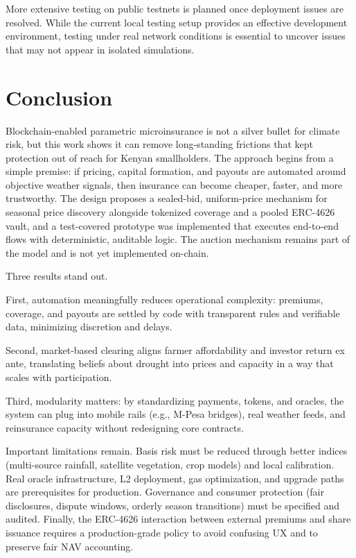 \documentclass[11pt,a4paper]{article}
\begin{document}
		More extensive testing on public testnets is planned once deployment issues are resolved. 
		While the current local testing setup provides an effective development environment, testing under real network conditions is essential to uncover issues that may not appear in isolated simulations.

		\section{Conclusion}\label{sec:conclusion}
		Blockchain-enabled parametric microinsurance is not a silver bullet for climate risk, but this work shows it can remove long-standing frictions that kept protection out of reach for Kenyan smallholders.
        The approach begins from a simple premise: if pricing, capital formation, and payouts are automated around objective weather signals, then insurance can become cheaper, faster, and more trustworthy.
        The design proposes a sealed-bid, uniform-price mechanism for seasonal price discovery alongside tokenized coverage and a pooled ERC-4626 vault, and a test-covered prototype was implemented that executes end-to-end flows with deterministic, auditable logic. The auction mechanism remains part of the model and is not yet implemented on-chain.

		Three results stand out.

        First, automation meaningfully reduces operational complexity: premiums, coverage, and payouts are settled by code with transparent rules and verifiable data, minimizing discretion and delays.

        Second, market-based clearing aligns farmer affordability and investor return ex ante, translating beliefs about drought into prices and capacity in a way that scales with participation.

        Third, modularity matters: by standardizing payments, tokens, and oracles, the system can plug into mobile rails (e.g., M-Pesa bridges), real weather feeds, and reinsurance capacity without redesigning core contracts.

		Important limitations remain.
        Basis risk must be reduced through better indices (multi-source rainfall, satellite vegetation, crop models) and local calibration.
        Real oracle infrastructure, L2 deployment, gas optimization, and upgrade paths are prerequisites for production.
        Governance and consumer protection (fair disclosures, dispute windows, orderly season transitions) must be specified and audited.
        Finally, the ERC-4626 interaction between external premiums and share issuance requires a production-grade policy to avoid confusing UX and to preserve fair NAV accounting.
\end{document}

